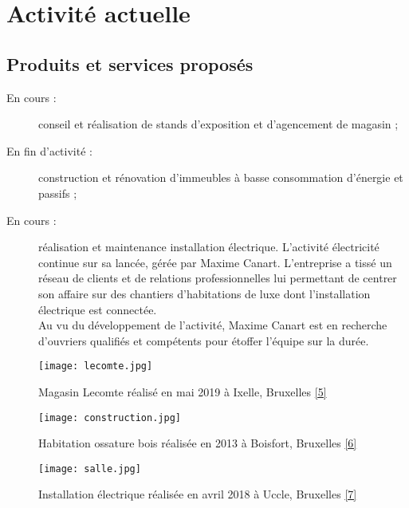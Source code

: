 \documentclass[a4paper, 12pt]{article}
\begin{document}
\section{Activité actuelle}

\subsection{Produits et services proposés}

\begin{description}
  
        \item [En cours :] conseil et réalisation de stands d'exposition et d'agencement de magasin ;
        \item [En fin d'activité :] construction et rénovation d'immeubles à basse consommation d'énergie et passifs ;     
        \item [En cours :] réalisation et maintenance installation électrique. L'activité électricité continue sur sa lancée, gérée par Maxime Canart. L'entreprise a tissé un réseau de clients et de relations professionnelles lui permettant de centrer son affaire  sur des chantiers d'habitations de luxe dont l'installation électrique est connectée.\\
Au vu du développement de l'activité, Maxime Canart est en recherche d'ouvriers qualifiés et compétents pour étoffer l'équipe sur la durée.

\end{description}

\begin{figure}[h]   
    \begin{minipage}[t]{.32\linewidth}
        \centering
        \texttt{[image: lecomte.jpg]}
        \caption{Magasin Lecomte réalisé en mai 2019 à Ixelle, Bruxelles \href{https://www.facebook.com/Eclips.electricite/photos/a.1014356022289082/1014357662288918/?type=3&theater}{[5]}}
    \end{minipage}
\hfill
    \begin{minipage}[t]{.32\linewidth}
        \centering
        \texttt{[image: construction.jpg]}
        \caption{Habitation ossature bois réalisée en 2013 à Boisfort, Bruxelles \href{https://www.eclips-sa.be/entreprise-gnrale}{[6]}}
    \end{minipage}
     \hfill   
     \begin{minipage}[t]{.32\linewidth}
        \centering
        \texttt{[image: salle.jpg]}
        \caption{Installation électrique réalisée en avril 2018 à Uccle, Bruxelles \href{https://www.facebook.com/Eclips.electricite/photos/a.675984922792862/679584145766273/?type=3&theater}{[7]}}
    \end{minipage}
\end{figure}
\end{document}
